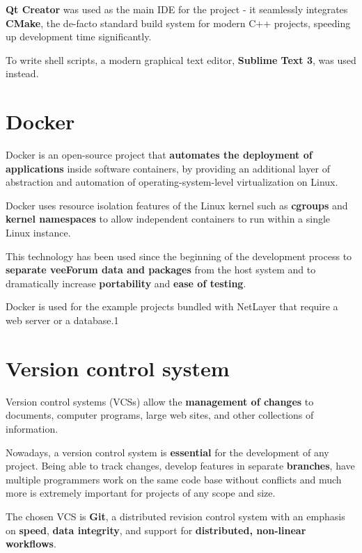 \documentclass[12pt]{report}
\newcommand{\+}{\discretionary{\mbox{\scriptsize$\hookleftarrow$}}{}{}}
\renewcommand\emph{\textbf}
\begin{document}
                \emph{Qt Creator} was used as the main IDE for the project - it seamlessly integrates \emph{CMake}, the de-facto standard build system for modern C++ projects, speeding up development time significantly.

                To write shell scripts, a modern graphical text editor, \emph{Sublime Text 3}, was used instead.

            \section{Docker}
                Docker is an open-source project that \emph{automates the deployment of applications} inside software containers, by providing an additional layer of abstraction and automation of operating-system-level virtualization on Linux.

                Docker uses resource isolation features of the Linux kernel such as \emph{cgroups} and \emph{kernel namespaces} to allow independent containers to run within a single Linux instance.

                This technology has been used since the beginning of the development process to \emph{separate veeForum data and packages} from the host system and to dramatically increase \emph{portability} and \emph{ease of testing}.

                Docker is used for the example projects bundled with NetLayer that require a web server or a database.1

            \section{Version control system}
                Version control systems (VCSs) allow the \emph{management of changes} to documents, computer programs, large web sites, and other collections of information.

                Nowadays, a version control system is \emph{essential} for the development of any project.
                Being able to track changes, develop features in separate \emph{branches}, have multiple programmers work on the same code base without conflicts and much more is extremely important for projects of any scope and size.

                The chosen VCS is \emph{Git}, a distributed revision control system with an emphasis on \emph{speed}, \emph{data integrity}, and support for \emph{distributed, non-linear workflows}.
\end{document}
